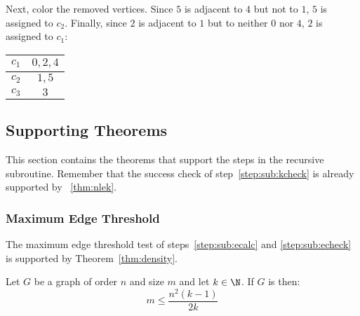 Next, color the removed vertices.  Since \(5\) is adjacent to \(4\) but not to \(1\), \(5\) is assigned to \(c_2\).
Finally, since \(2\) is adjacent to \(1\) but to neither \(0\) nor \(4\), \(2\) is assigned to \(c_1\):

\begin{center}
  \begin{tabular}{|c|c|}
    \hline
    \(c_1\) & \(0,2,4\) \\
    \hline
    \(c_2\) & \(1,5\) \\
    \hline
    \(c_3\) & \(3\) \\
    \hline
  \end{tabular}
\end{center}

\bigskip

\subsection{Supporting Theorems}\label{sec:sub:theorems}

This section contains the theorems that support the steps in the recursive subroutine.  Remember that the success
check of step~\ref{step:sub:kcheck} is already supported by \theoremname~\ref{thm:nlek}.

\subsubsection{Maximum Edge Threshold}\label{sec:sub:sub:edges}

The maximum edge threshold test of steps~\ref{step:sub:ecalc} and \ref{step:sub:echeck} is supported by
Theorem~\ref{thm:density}.

\begin{theorem}
  \label{thm:density}
  Let \(G\) be a graph of order \(n\) and size \(m\) and let \(k\in\N\).  If \(G\) is  then:
  \[m\le\frac{n^2(k-1)}{2k}\]
\end{theorem}

